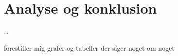 \part{Analyse og konklusion}\label{part:analysis}

\ldots

forestiller mig grafer og tabeller der siger noget om noget
